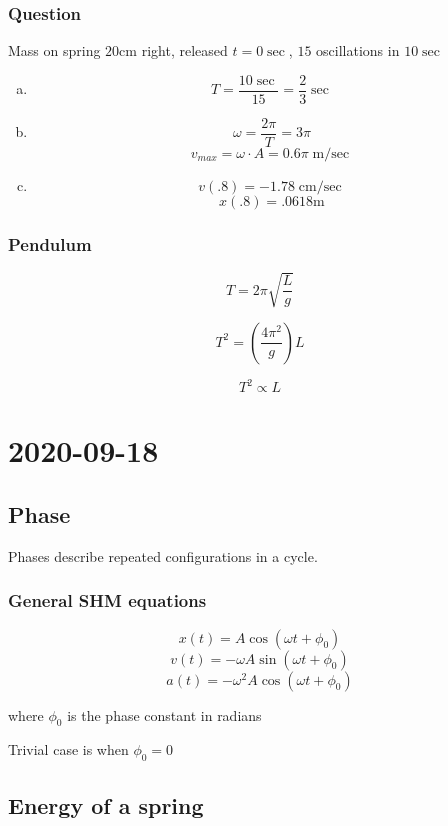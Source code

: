 \subsubsection{Question}

Mass on spring $20\si{\cm}$ right, released $t = 0\sec$, $15$ oscillations in $10\sec$

\begin{enumerate}[a.]
    \item $$T = \frac{10\sec}{15} = \frac{2}{3}\sec$$
    \item $$\omega = \frac{2\pi}{T} = 3\pi$$
    $$v_{max} = \omega \cdot A = 0.6\pi \si{\m\per\sec}$$
    \item $$v(.8) = -1.78 \si{\cm\per\sec}$$
    $$x(.8) = .0618\si{\m}$$
\end{enumerate}

\subsubsection{Pendulum}

$$T = 2\pi \sqrt{\frac{L}{g}}$$

$$T^2 = \left(\frac{4\pi^2}{g}\right)L$$

$$T^2 \propto L$$

\section{2020-09-18}

\subsection{Phase}

Phases describe repeated configurations in a cycle.

\subsubsection{General SHM equations}

$$x(t) = A\cos(\omega t + \phi_0)$$
$$v(t) = -\omega A\sin(\omega t + \phi_0)$$
$$a(t) = -\omega^2 A\cos(\omega t + \phi_0)$$

where $\phi_0$ is the phase constant in radians

Trivial case is when $\phi_0 = 0$

\subsection{Energy of a spring}

